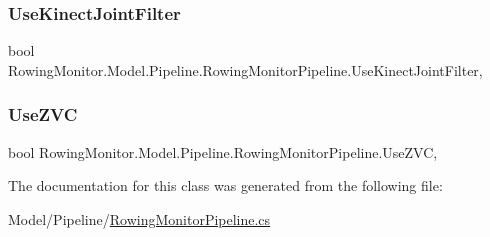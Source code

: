 \subsubsection{\texorpdfstring{Use\+Kinect\+Joint\+Filter}{UseKinectJointFilter}}
{\footnotesize\ttfamily bool Rowing\+Monitor.\+Model.\+Pipeline.\+Rowing\+Monitor\+Pipeline.\+Use\+Kinect\+Joint\+Filter\hspace{0.3cm}{\ttfamily [get]}, {\ttfamily [set]}}

\mbox{\label{class_rowing_monitor_1_1_model_1_1_pipeline_1_1_rowing_monitor_pipeline_adb430c312bae7b16bd6ae08e9f7450af}} 
\subsubsection{\texorpdfstring{Use\+Z\+VC}{UseZVC}}
{\footnotesize\ttfamily bool Rowing\+Monitor.\+Model.\+Pipeline.\+Rowing\+Monitor\+Pipeline.\+Use\+Z\+VC\hspace{0.3cm}{\ttfamily [get]}, {\ttfamily [set]}}



The documentation for this class was generated from the following file\+:\begin{DoxyCompactItemize}
\item 
Model/\+Pipeline/\hyperlink{_rowing_monitor_pipeline_8cs}{Rowing\+Monitor\+Pipeline.\+cs}\end{DoxyCompactItemize}
